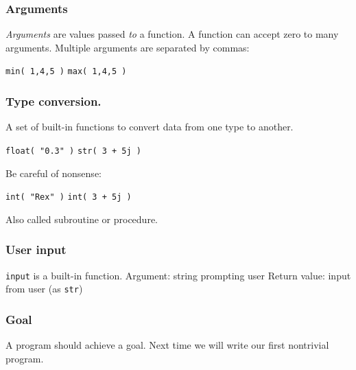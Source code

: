 \documentclass[11pt]{beamer}
\begin{document}
\begin{frame}
  \frametitle{Arguments}
  \Enlarge

  \begin{itemize}
  \myitem  \emph{Arguments} are values passed \emph{to} a function. \pause
  \myitem  A function can accept zero to many arguments. \pause
  \myitem  Multiple arguments are separated by commas:
    \begin{itemize}
    \mysubitem  \texttt{min( 1,4,5 )}
    \mysubitem  \texttt{max( 1,4,5 )}
    \end{itemize}
  \end{itemize}
\end{frame}

\begin{frame}
  \frametitle{Type conversion.}
  \Enlarge

  \begin{itemize}
  \myitem  A set of built-in functions to convert data from one type to another. \pause
    \begin{itemize}
    \mysubitem  \texttt{float( "0.3" )}
    \mysubitem  \texttt{str( 3 + 5j )}
    \end{itemize} \pause
  \myitem  Be careful of nonsense:
    \begin{itemize}
    \mysubitem  \texttt{int( "Rex" )}
    \mysubitem  \texttt{int( 3 + 5j )}
    \end{itemize}
  \myitem  Also called subroutine or procedure.
  \end{itemize}
\end{frame}

\begin{frame}
  \frametitle{User input}
  \Enlarge

  \begin{itemize}
  \myitem  \texttt{input} is a built-in function. \pause
  \myitem  Argument:  string prompting user \pause
  \myitem  Return value:  input from user (as \texttt{str})
  \end{itemize}
\end{frame}

\begin{frame}
  \frametitle{Goal}
  \Enlarge

  \begin{itemize}
  \myitem  A program should achieve a goal. \pause
  \myitem  Next time we will write our first nontrivial program.
  \end{itemize}
\end{frame}
\end{document}

